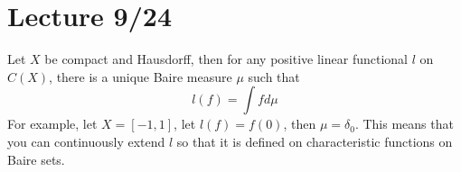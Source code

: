 \documentclass[openany]{book}
\begin{document}
\section{Lecture 9/24}
\begin{prop}
    Let $X$ be compact and Hausdorff, then for any positive linear functional $l$ on $C(X)$, there is a unique Baire measure $\mu$ such that 
    \begin{equation*}
        l(f)=\int fd\mu
    \end{equation*}
    For example, let $X=[-1,1]$, let $l(f)=f(0)$, then $\mu=\delta_0$. This means that you can continuously extend $l$ so that it is defined on characteristic functions on Baire sets.
\end{prop}
\end{document}
